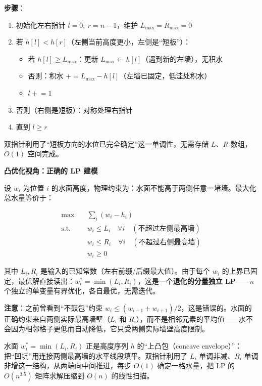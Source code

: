 \documentclass[12pt, a4paper]{ctexart}
\begin{document}
\begin{blackboard}
\textbf{步骤}：
\begin{enumerate}
    \item 初始化左右指针 $l=0,\ r=n-1$，维护 $L_{\max}=R_{\max}=0$
    \item 若 $h[l] < h[r]$（左侧当前高度更小，左侧是``短板''）：
          \begin{itemize}
              \item 若 $h[l] \geq L_{\max}$：更新 $L_{\max} \leftarrow h[l]$（遇到新的左墙），无积水
              \item 否则：积水 $\mathrel{+}= L_{\max} - h[l]$（左墙已固定，低洼处积水）
              \item $l \mathrel{+}= 1$
          \end{itemize}
    \item 否则（右侧是短板）：对称处理右指针
    \item 直到 $l \geq r$
\end{enumerate}

双指针利用了``短板方向的水位已完全确定''这一单调性，无需存储 $L$、$R$ 数组，$O(1)$ 空间完成。

\textbf{凸优化视角：正确的 LP 建模}

设 $w_i$ 为位置 $i$ 的水面高度，物理约束为：水面不能高于两侧任意一堵墙。最大化总水量等价于：

\begin{align}
\max \quad & \sum_i (w_i - h_i) \\
\text{s.t.} \quad & w_i \leq L_i \quad \forall i \quad (\text{不超过左侧最高墙}) \\
& w_i \leq R_i \quad \forall i \quad (\text{不超过右侧最高墙}) \\
& w_i \geq 0
\end{align}

其中 $L_i, R_i$ 是输入的已知常数（左右前缀/后缀最大值）。由于每个 $w_i$ 的上界已固定，最优解直接读出：$w_i^* = \min(L_i, R_i)$，这是一个\textbf{退化的分量独立 LP}——$n$ 个独立的单变量有界优化，各自最优，无需迭代。

\textbf{注意}：之前曾看到``不鼓包''约束 $w_i \leq (w_{i-1}+w_{i+1})/2$，这是错误的。水面的正确约束来自两侧实际最高墙壁（$L_i$ 和 $R_i$），而不是相邻元素的平均值——水不会因为相邻格子更低而自动降低，它只受两侧实际墙壁高度限制。

\begin{insight}[接雨水的几何本质]
水面 $w_i^* = \min(L_i, R_i)$ 正是高度序列 $h$ 的``上凸包（concave envelope）''：把``凹坑''用连接两侧最高墙的水平线段填平。双指针利用了 $L_i$ 单调非减、$R_i$ 单调非增这一结构，从两端向中间推进，每步 $O(1)$ 确定一格水量，把 LP 的 $O(n^{3.5})$ 矩阵求解压缩到 $O(n)$ 的线性扫描。
\end{insight}


\end{blackboard}
\end{document}
